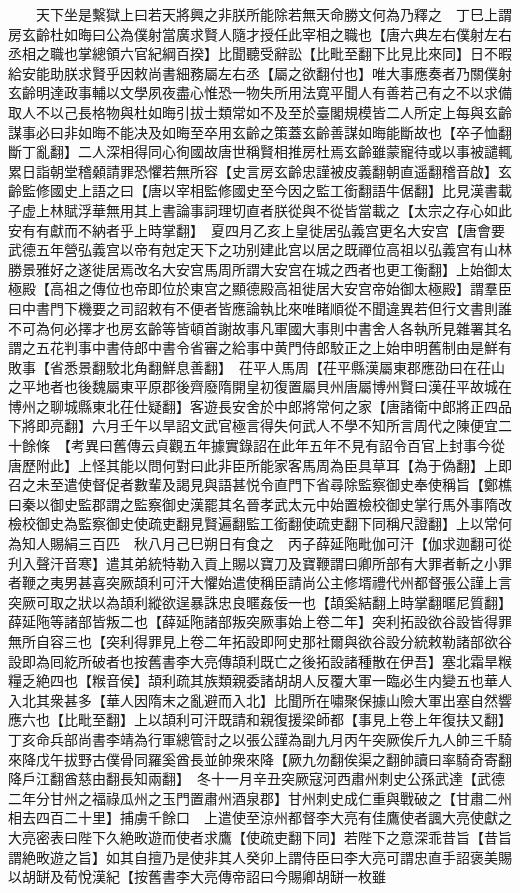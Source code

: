 　　天下坐是繫獄上曰若天將興之非朕所能除若無天命勝文何為乃釋之　丁巳上謂房玄齡杜如晦曰公為僕射當廣求賢人隨才授任此宰相之職也【唐六典左右僕射左右丞相之職也掌總領六官紀綱百揆】比聞聽受辭訟【比毗至翻下比見比來同】日不暇給安能助朕求賢乎因敕尚書細務屬左右丞【屬之欲翻付也】唯大事應奏者乃關僕射玄齡明達政事輔以文學夙夜盡心惟恐一物失所用法寛平聞人有善若己有之不以求備取人不以己長格物與杜如晦引拔士類常如不及至於臺閣規模皆二人所定上每與玄齡謀事必曰非如晦不能决及如晦至卒用玄齡之策蓋玄齡善謀如晦能斷故也【卒子恤翻斷丁亂翻】二人深相得同心徇國故唐世稱賢相推房杜焉玄齡雖蒙寵待或以事被譴輒累日詣朝堂稽顙請罪恐懼若無所容【史言房玄齡忠謹被皮義翻朝直遥翻稽音啟】玄齡監修國史上語之曰【唐以宰相監修國史至今因之監工銜翻語牛倨翻】比見漢書載子虚上林賦浮華無用其上書論事詞理切直者朕從與不從皆當載之【太宗之存心如此安有有獻而不納者乎上時掌翻】　夏四月乙亥上皇徙居弘義宫更名大安宫【唐會要武德五年營弘義宫以帝有尅定天下之功别建此宫以居之既禪位高祖以弘義宫有山林勝景雅好之遂徙居焉改名大安宫馬周所謂大安宫在城之西者也更工衡翻】上始御太極殿【高祖之傳位也帝即位於東宫之顯德殿高祖徙居大安宫帝始御太極殿】謂羣臣曰中書門下機要之司詔敕有不便者皆應論執比來唯睹順從不聞違異若但行文書則誰不可為何必擇才也房玄齡等皆頓首謝故事凡軍國大事則中書舍人各執所見雜署其名謂之五花判事中書侍郎中書令省審之給事中黄門侍郎駮正之上始申明舊制由是鮮有敗事【省悉景翻駮北角翻鮮息善翻】　茌平人馬周【茌平縣漢屬東郡應劭曰在茌山之平地者也後魏屬東平原郡後齊廢隋開皇初復置屬貝州唐屬博州賢曰漢茌平故城在博州之聊城縣東北茌仕疑翻】客遊長安舍於中郎將常何之家【唐諸衛中郎將正四品下將即亮翻】六月壬午以旱詔文武官極言得失何武人不學不知所言周代之陳便宜二十餘條　【考異曰舊傳云貞觀五年據實錄詔在此年五年不見有詔令百官上封事今從唐歷附此】上怪其能以問何對曰此非臣所能家客馬周為臣具草耳【為于偽翻】上即召之未至遣使督促者數輩及謁見與語甚悦令直門下省尋除監察御史奉使稱旨【鄭樵曰秦以御史監郡謂之監察御史漢罷其名晉孝武太元中始置檢校御史掌行馬外事隋改檢校御史為監察御史使疏吏翻見賢遍翻監工銜翻使疏吏翻下同稱尺證翻】上以常何為知人賜絹三百匹　秋八月己巳朔日有食之　丙子薛延陁毗伽可汗【伽求迦翻可從刋入聲汗音寒】遣其弟統特勒入貢上賜以寶刀及寶鞭謂曰卿所部有大罪者斬之小罪者鞭之夷男甚喜突厥頡利可汗大懼始遣使稱臣請尚公主修壻禮代州都督張公謹上言突厥可取之狀以為頡利縱欲逞暴誅忠良暱姦佞一也【頡奚結翻上時掌翻暱尼質翻】薛延陁等諸部皆叛二也【薛延陁諸部叛突厥事始上卷二年】突利拓設欲谷設皆得罪無所自容三也【突利得罪見上卷二年拓設即阿史那社爾與欲谷設分統敕勒諸部欲谷設即為囘紇所破者也按舊書李大亮傳頡利既亡之後拓設諸種散在伊吾】塞北霜旱糇糧乏絶四也【糇音侯】頡利疏其族類親委諸胡胡人反覆大軍一臨必生内變五也華人入北其衆甚多【華人因隋末之亂避而入北】比聞所在嘯聚保據山險大軍出塞自然響應六也【比毗至翻】上以頡利可汗既請和親復援梁師都【事見上卷上年復扶又翻】丁亥命兵部尚書李靖為行軍總管討之以張公謹為副九月丙午突厥俟斤九人帥三千騎來降戊午拔野古僕骨同羅奚酋長並帥衆來降【厥九勿翻俟渠之翻帥讀曰率騎奇寄翻降戶江翻酋慈由翻長知兩翻】　冬十一月辛丑突厥寇河西肅州刺史公孫武達【武德二年分甘州之福祿瓜州之玉門置肅州酒泉郡】甘州刺史成仁重與戰破之【甘肅二州相去四百二十里】捕虜千餘口　上遣使至涼州都督李大亮有佳鷹使者諷大亮使獻之大亮密表曰陛下久絶畋遊而使者求鷹【使疏吏翻下同】若陛下之意深乖昔旨【昔旨謂絶畋遊之旨】如其自擅乃是使非其人癸卯上謂侍臣曰李大亮可謂忠直手詔褒美賜以胡缾及荀悅漢紀【按舊書李大亮傳帝詔曰今賜卿胡缾一枚雖